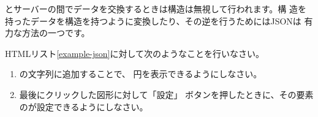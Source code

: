 \HTML とサーバーの間でデータを交換するときは構造は無視して行われます。構
造を持ったデータを構造を持つように変換したり、その逆を行うためにはJSONは
有力な方法の一つです。
\begin{Problem}\upshape
 HTMLリスト\ref{example-json}に対して次のようなことを行いなさい。
 \begin{enumerate}
	\item {}の文字列に追加することで、
 円を表示できるようにしなさい。
	\item 最後にクリックした図形に対して「設定」
 ボタンを押したときに、その要素のが設定できるようにしなさい。
 \end{enumerate}
\end{Problem}
\fi